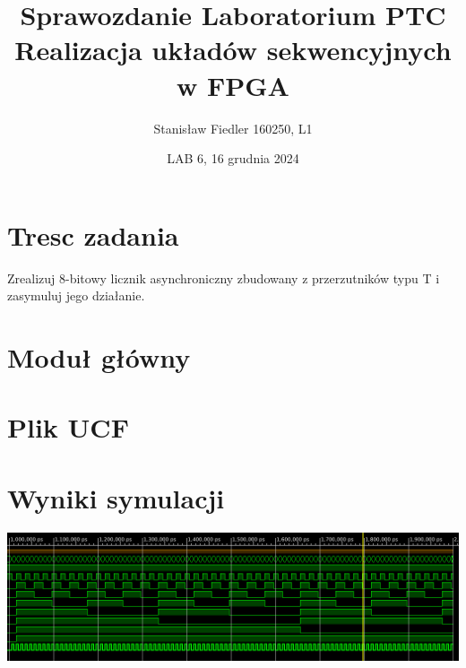 \documentclass[a4paper, 11pt]{article}
\title{%
       \large Sprawozdanie Laboratorium PTC \\
       \huge Realizacja układów sekwencyjnych w FPGA}
\author{Stanisław Fiedler 160250, L1}
\date{LAB 6, 16 grudnia 2024}
\begin{document}
\maketitle

\section{Tresc zadania}\label{sec:tresc_zadania} %
Zrealizuj 8-bitowy licznik asynchroniczny zbudowany z przerzutników typu T i zasymuluj jego
działanie.

\section{Moduł główny}\label{sec:plik_vhd} %


\section{Plik UCF}\label{sec:plik_ucf} %


\section{Wyniki symulacji}\label{sec:wyniki_symulacji} %

\begin{center}
	\includegraphics[scale=0.6]{symulacja.png}
\end{center}
\end{document}
